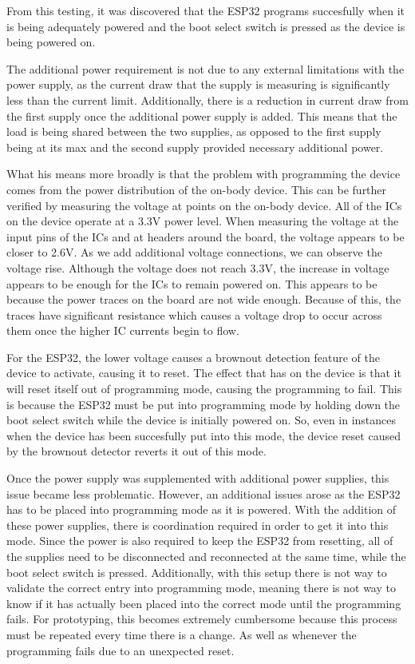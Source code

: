 From this testing, it was discovered that the ESP32 programs succesfully when it is being adequately powered
and the boot select switch is pressed as the device is being powered on.

The additional power requirement is not due to any external limitations with the power supply,
as the current draw that the supply is measuring is significantly less than the current limit.
Additionally, there is a reduction in current draw from the first supply once the additional power supply is added.
This means that the load is being shared between the two supplies,
as opposed to the first supply being at its max and the second supply provided necessary additional power.

What his means more broadly is that the problem with programming the device comes from the power distribution of the on-body device.
This can be further verified by measuring the voltage at points on the on-body device.
All of the ICs on the device operate at a 3.3V power level.
When measuring the voltage at the input pins of the ICs and at headers around the board, the voltage appears to be closer to 2.6V.
As we add additional voltage connections, we can observe the voltage rise.
Although the voltage does not reach 3.3V, the increase in voltage appears to be enough for the ICs to remain powered on.
This appears to be because the power traces on the board are not wide enough.
Because of this, the traces have significant resistance which causes a voltage drop to occur across them once the higher IC currents begin to flow.

For the ESP32, the lower voltage causes a brownout detection feature of the device to activate, causing it to reset.
The effect that has on the device is that it will reset itself out of programming mode, causing the programming to fail.
This is because the ESP32 must be put into programming mode by holding down the boot select switch while the device is initially powered on.
So, even in instances when the device has been succesfully put into this mode,
the device reset caused by the brownout detector reverts it out of this mode.

Once the power supply was supplemented with additional power supplies, this issue became less problematic.
However, an additional issues arose as the ESP32 has to be placed into programming mode as it is powered.
With the addition of these power supplies, there is coordination required in order to get it into this mode.
Since the power is also required to keep the ESP32 from resetting, all of the supplies need to be disconnected and reconnected at the same time,
while the boot select switch is pressed.
Additionally, with this setup there is not way to validate the correct entry into programming mode,
meaning there is not way to know if it has actually been placed into the correct mode until the programming fails.
For prototyping, this becomes extremely cumbersome because this process must be repeated every time there is a change.
As well as whenever the programming fails due to an unexpected reset.

